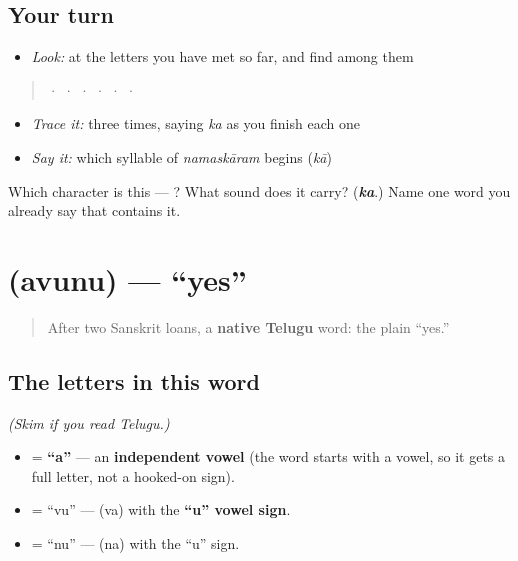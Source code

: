 \subsection*{Your turn}
\begin{itemize}
\raggedright
  \item \emph{Look:} at the letters you have met so far, and find  among them
\end{itemize}

\begin{quote}
  ·    ·    ·    ·    ·    ·  
\end{quote}

\begin{itemize}
\raggedright
  \item \emph{Trace it:}  three times, saying \emph{ka} as you finish each one
  \item \emph{Say it:} which syllable of \emph{namaskāram}  begins (\emph{kā})
\end{itemize}

\begin{tcolorbox}[breakable,colback=teal!4,colframe=teal!35!black,title={Before you move on}]
Which character is this — ? What sound does it carry? (\emph{\textbf{ka}}.) Name one word you already say that contains it.
\end{tcolorbox}
\section[\texorpdfstring{\te{అవును} (avunu)}{అవును (avunu)}]{ (avunu) — \textquotedblleft{}yes\textquotedblright{}}

\label{lesson:TE-C01-avunu}



\begin{quote}
After two Sanskrit loans, a \textbf{native Telugu} word: the plain \textquotedblleft{}yes.\textquotedblright{}
\end{quote}

\subsection*{The letters in this word}
\emph{(Skim if you read Telugu.)}

\begin{itemize}
\raggedright
  \item \textbf{} = \textbf{\textquotedblleft{}a\textquotedblright{}} — an \textbf{independent vowel} (the word starts with a vowel, so it gets a full letter, not a hooked-on sign).
  \item \textbf{} = \textquotedblleft{}vu\textquotedblright{} — \textbf{} (va) with the \textbf{\textquotedblleft{}u\textquotedblright{} vowel sign}.
  \item \textbf{} = \textquotedblleft{}nu\textquotedblright{} — \textbf{} (na) with the \textquotedblleft{}u\textquotedblright{} sign.
\end{itemize}

